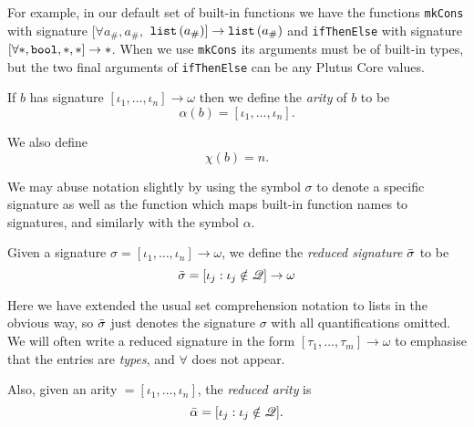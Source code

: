 
\noindent For example, in our default set of built-in functions we have the
functions \texttt{mkCons} with signature $[\forall a_\#, a_\#,$  %
  $\mathtt{list}\,\mathtt{(}a_\#\mathtt{)}] \rightarrow \mathtt{list}\,\mathtt{(}a_\#\mathtt{)}$ and \texttt{ifThenElse} with signature
$[\forallStar, \mathtt{bool}, \star, \star] \rightarrow \star$.  When we use
\texttt{mkCons} its arguments must be of built-in types, but the two final
arguments of \texttt{ifThenElse} can be any Plutus Core values.

\smallskip
\noindent If $b$ has signature $[\iota_1, \ldots, \iota_n] \rightarrow \omega$ then we define
the \textit{arity}  of $b$ to be
$$
\alpha(b) = [\iota_1, \ldots, \iota_n].
$$%

\noindent We also define
$$
  \chi(b) = n.
$$%

\noindent We may abuse notation slightly by using the symbol $\sigma$ to denote
a specific signature as well as the function which maps built-in function names
to signatures, and similarly with the symbol $\alpha$.

\medskip
\noindent Given a signature
$\sigma = [\iota_1, \ldots, \iota_n] \rightarrow \omega$,
we define the \textit{reduced signature} $\bar{\sigma}$ to be
$$
\bar{\sigma} = [\iota_j : \iota_j \notin \mathscr{Q}] \rightarrow \omega
$$%

\noindent Here we have extended the usual set comprehension notation to lists in the
obvious way, so $\bar{\sigma}$ just denotes the signature $\sigma$ with all
quantifications omitted. We will often write a reduced signature in the form
$[\tau_1, \ldots, \tau_m] \rightarrow \omega$ to emphasise that the entries are
\textit{types}, and $\mathbf{\forall}$ does not appear.

\medskip
\noindent Also, given an arity $= [\iota_1, \ldots, \iota_n]$, the \textit{reduced
  arity} is
$$
\bar{\alpha} = [\iota_j : \iota_j \notin \mathscr{Q}].
$$%

